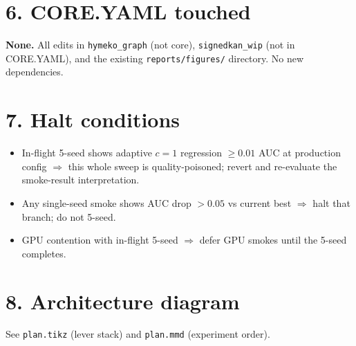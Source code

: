 \documentclass[a4paper,11pt]{article}
\begin{document}
\section*{6. CORE.YAML touched}

\textbf{None.}  All edits in \texttt{hymeko\_graph} (not core),
\texttt{signedkan\_wip} (not in CORE.YAML), and the existing
\texttt{reports/figures/} directory.  No new dependencies.

\section*{7. Halt conditions}

\begin{itemize}
  \item In-flight 5-seed shows adaptive $c{=}1$ regression $\ge 0.01$
    AUC at production config $\Rightarrow$ this whole sweep is
    quality-poisoned; revert and re-evaluate the smoke-result
    interpretation.
  \item Any single-seed smoke shows AUC drop $> 0.05$ vs current
    best $\Rightarrow$ halt that branch; do not 5-seed.
  \item GPU contention with in-flight 5-seed $\Rightarrow$ defer
    GPU smokes until the 5-seed completes.
\end{itemize}

\section*{8. Architecture diagram}

See \texttt{plan.tikz} (lever stack) and \texttt{plan.mmd}
(experiment order).

\begin{center}

\end{center}
\end{document}
